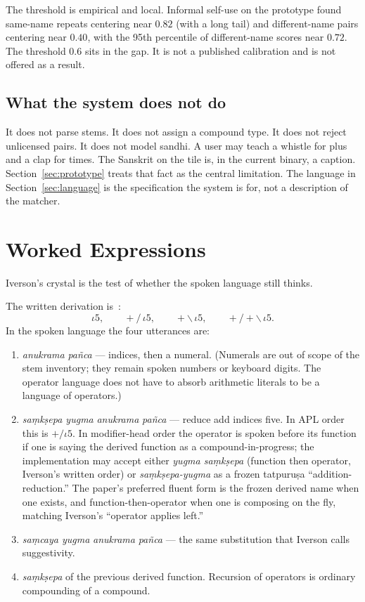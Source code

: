 \documentclass[manuscript, review, anonymous]{acmart}
\begin{document}
The threshold is empirical and local. Informal self-use on the prototype found same-name repeats centering near $0.82$ (with a long tail) and different-name pairs centering near $0.40$, with the 95th percentile of different-name scores near $0.72$. The threshold $0.6$ sits in the gap. It is not a published calibration and is not offered as a result.

\subsection{What the system does not do}

It does not parse stems. It does not assign a compound type. It does not reject unlicensed pairs. It does not model sandhi. A user may teach a whistle for plus and a clap for times. The Sanskrit on the tile is, in the current binary, a caption. Section~\ref{sec:prototype} treats that fact as the central limitation. The language in Section~\ref{sec:language} is the specification the system is for, not a description of the matcher.

\section{Worked Expressions}
\label{sec:examples}

Iverson's crystal is the test of whether the spoken language still thinks.

The written derivation is~\cite{Iverson1980Notation}:
\[
\iota 5,\qquad +/\,\iota 5,\qquad +\backslash\,\iota 5,\qquad +/+\backslash\,\iota 5.
\]
In the spoken language the four utterances are:

\begin{enumerate}
\item \textit{anukrama} \textit{pa{\~n}ca} --- indices, then a numeral. (Numerals are out of scope of the stem inventory; they remain spoken numbers or keyboard digits. The operator language does not have to absorb arithmetic literals to be a language of operators.)
\item \textit{sa{\d{m}}k{\d{s}}epa yugma} \textit{anukrama} \textit{pa{\~n}ca} --- reduce add indices five. In APL order this is $+/\iota 5$. In modifier-head order the operator is spoken before its function if one is saying the derived function as a compound-in-progress; the implementation may accept either \textit{yugma sa{\d{m}}k{\d{s}}epa} (function then operator, Iverson's written order) or \textit{sa{\d{m}}k{\d{s}}epa-yugma} as a frozen tatpuru{\d{s}}a ``addition-reduction.'' The paper's preferred fluent form is the frozen derived name when one exists, and function-then-operator when one is composing on the fly, matching Iverson's ``operator applies left.''
\item \textit{sa{\d{m}}caya yugma} \textit{anukrama} \textit{pa{\~n}ca} --- the same substitution that Iverson calls suggestivity.
\item \textit{sa{\d{m}}k{\d{s}}epa} of the previous derived function. Recursion of operators is ordinary compounding of a compound.
\end{enumerate}
\end{document}
